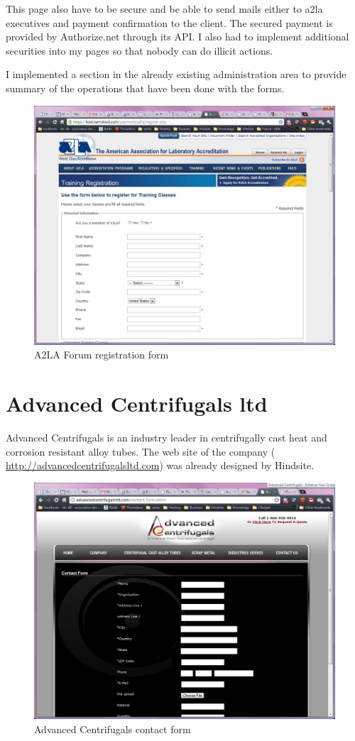 This page also have to be secure and be able to send mails either to a2la executives and payment confirmation to the client.
The secured payment is provided by Authorize.net through its API. I also had to implement additional securities into my pages so that nobody can do illicit actions.

I implemented a section in the already existing administration area to provide summary of the operations that have been done with the forms.

\begin{figure}[!hb]
\centering
\includegraphics[width=.55\textwidth]{img/a2la.jpg}
\caption{A2LA Forum registration form}
\label{figure:a2la_reg}
\end{figure}


\section{Advanced Centrifugals ltd}
Advanced Centrifugals is an industry leader in centrifugally cast heat and corrosion resistant alloy tubes. 
The web site of the company ( \url{http://advancedcentrifugalsltd.com}) was already designed by Hindsite. 

\begin{figure}[!h]
\centering
\includegraphics[width=.55\textwidth]{img/adv_1.jpg}
\caption{Advanced Centrifugals contact form}
\label{figure:adv_1}
\end{figure}

